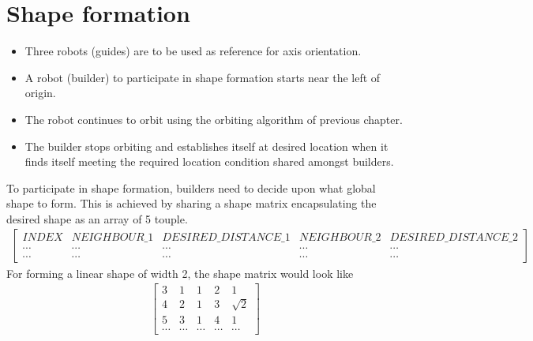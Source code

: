\documentclass{report}[12pt]
\begin{document}
\section{Shape formation}
\begin{itemize}
        \item Three robots (guides) are to be used as reference for axis orientation.
        \item A robot (builder) to participate in shape formation starts near the left of origin.
        \item The robot continues to orbit using the orbiting algorithm of previous chapter.
        \item The builder stops orbiting and establishes itself at desired location when it finds itself meeting the required location condition shared amongst builders.
\end{itemize}
To participate in shape formation, builders need to decide upon what global shape to form. This is achieved by sharing a shape matrix encapsulating the desired shape as an array of 5 touple.
\begin{align}
\begin{bmatrix}
    INDEX & NEIGHBOUR\_1 & DESIRED\_DISTANCE\_1 & NEIGHBOUR\_2 & DESIRED\_DISTANCE\_2\\
    \cdots & \cdots & \cdots & \cdots & \cdots\\
    \cdots & \cdots & \cdots & \cdots & \cdots
\end{bmatrix}
\end{align}
For forming a linear shape of width 2, the shape matrix would look like
\begin{align}
\label{eq:shape_matrix_linear}
\begin{bmatrix}
    3 & 1 & 1 & 2 & 1\\
    4 & 2 & 1 & 3 & \sqrt{2}\\
    5 & 3 & 1 & 4 & 1\\
    \cdots & \cdots & \cdots & \cdots & \cdots
\end{bmatrix}
\end{align}
\end{document}

